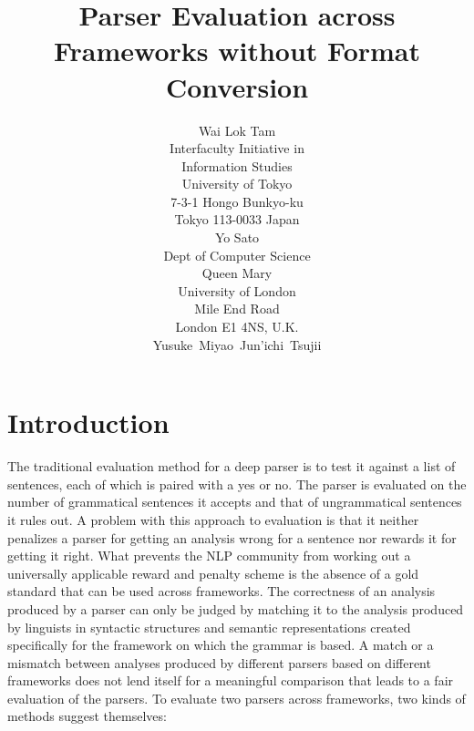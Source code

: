 \documentclass[11pt]{article}
\title{Parser Evaluation across Frameworks without Format Conversion}
\author{\parbox[t]{5cm}{\centering Wai Lok Tam\\{\rm Interfaculty Initiative in\\Information Studies\\University of Tokyo\\7-3-1 Hongo Bunkyo-ku\\ Tokyo
113-0033 Japan}}\parbox[t]{5cm}{\centering Yo Sato\\{\rm Dept of Computer Science\\Queen Mary\\University of London\\Mile End Road\\London E1 4NS, U.K.}}\parbox[t]{5cm}{\mbox{Yusuke Miyao \hspace{1em} Jun'ichi Tsujii}\\\parbox{5cm}{\centering {\rm \vspace{1mm}Dept of Computer Science\\University of Tokyo\\7-3-1 Hongo Bunkyo-ku\\Tokyo113-0033 Japan } }} }
\date{}
\begin{document}
\maketitle

\begin{abstract}
 
\end{abstract}



\section{Introduction}


The traditional evaluation method for a deep parser is to test it against a list of sentences, each of which is paired with a yes or no. The parser is evaluated on the number of  grammatical sentences it accepts and that of ungrammatical sentences it rules out. A problem with this approach to evaluation is that it neither penalizes a parser for getting an analysis wrong for a sentence nor rewards it for getting it right. What prevents the NLP community from working out a universally applicable reward and penalty scheme is the absence of a gold standard that can be used across frameworks. The correctness of an analysis produced by a parser  can only be judged by matching it to the analysis produced by linguists in syntactic structures and semantic representations created specifically for the framework on which the grammar is based. A match or a mismatch between analyses produced by different parsers based on different frameworks does not lend itself for a meaningful comparison that leads to a fair evaluation of the parsers. To evaluate two parsers across frameworks, two kinds of methods suggest themselves:
\end{document}
